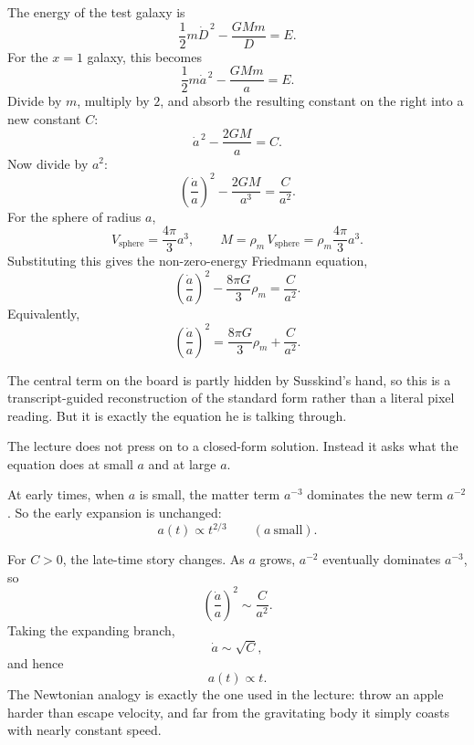 The energy of the test galaxy is
\begin{equation}
\frac{1}{2}m\dot D^{\,2}-\frac{GMm}{D}=E.
\end{equation}
For the \(x=1\) galaxy, this becomes
\begin{equation}
\frac{1}{2}m\dot a^{\,2}-\frac{GMm}{a}=E.
\end{equation}
Divide by \(m\), multiply by \(2\), and absorb the resulting constant on the right into a new constant \(C\):
\begin{equation}
\dot a^{\,2}-\frac{2GM}{a}=C.
\end{equation}
Now divide by \(a^2\):
\begin{equation}
\left(\frac{\dot a}{a}\right)^2-\frac{2GM}{a^3}=\frac{C}{a^2}.
\end{equation}
For the sphere of radius \(a\),
\begin{equation}
V_{\text{sphere}}=\frac{4\pi}{3}a^3,
\qquad
M=\rho_m\,V_{\text{sphere}}=\rho_m \frac{4\pi}{3}a^3.
\end{equation}
Substituting this gives the non-zero-energy Friedmann equation,
\begin{equation}
\left(\frac{\dot a}{a}\right)^2-\frac{8\pi G}{3}\rho_m=\frac{C}{a^2}.
\end{equation}
Equivalently,
\begin{equation}
\left(\frac{\dot a}{a}\right)^2=\frac{8\pi G}{3}\rho_m+\frac{C}{a^2}.
\end{equation}

The central term on the board is partly hidden by Susskind's hand, so this is a transcript-guided reconstruction of the standard form rather than a literal pixel reading. But it is exactly the equation he is talking through.

The lecture does not press on to a closed-form solution. Instead it asks what the equation does at small \(a\) and at large \(a\).

At early times, when \(a\) is small, the matter term \(a^{-3}\) dominates the new term \(a^{-2}\). So the early expansion is unchanged:
\begin{equation}
a(t)\propto t^{2/3}
\qquad
(a \ \text{small}).
\end{equation}

For \(C>0\), the late-time story changes. As \(a\) grows, \(a^{-2}\) eventually dominates \(a^{-3}\), so
\begin{equation}
\left(\frac{\dot a}{a}\right)^2 \sim \frac{C}{a^2}.
\end{equation}
Taking the expanding branch,
\begin{equation}
\dot a \sim \sqrt{C},
\end{equation}
and hence
\begin{equation}
a(t)\propto t.
\end{equation}
The Newtonian analogy is exactly the one used in the lecture: throw an apple harder than escape velocity, and far from the gravitating body it simply coasts with nearly constant speed.

